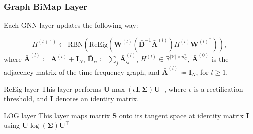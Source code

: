 \documentclass{beamer}
\begin{document}
\begin{frame}
\frametitle{Graph BiMap Layer}

Each GNN layer updates the following way:

\[
	H^{(l+1)} \leftarrow \text{RBN}\left(\text{ReEig}\left(\mathbf{W}^{(l)}(\mathbf{\bar{D}}^{-1} \mathbf{\bar{A}}^{(l)}) H^{(l)} \mathbf{W}^{(l) ^ \top}\right)\right),
\]
where $\mathbf{\bar{A}}^{(l)} \coloneqq \mathbf{A}^{(l)} + \mathbf{I}_N$, $\mathbf{\bar{D}}_{ii} \coloneqq \sum_j \mathbf{\bar{A}}^{(l)}_{ij}$, $H^{(l)} \in \mathbb{R}^{\lvert \mathcal{V} \rvert \times n_C^2}$, $\mathbf{\bar{A}}^{(0)}$ is the adjacency matrix of the time-frequency graph, and $\mathbf{\bar{A}}^{(l)} \coloneqq \mathbf{I}_N$, for $l \ge 1$.

\begin{block}{ReEig layer}
	This layer performs $\mathbf{U} \max(\epsilon \mathbf{I}, \mathbf{\Sigma}) \mathbf{U}^{\top}$, where $\epsilon$ is a rectification threshold, and $\mathbf{I}$ denotes an identity matrix.
\end{block}

\begin{block}{LOG layer}
	This layer maps matrix $\mathbf{S}$ onto its tangent space at identity matrix $\mathbf{I}$ using $\mathbf{U} \log(\mathbf{\Sigma}) \mathbf{U}^{\top}$
\end{block}
\end{frame}
\end{document}
